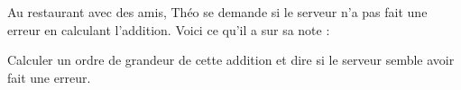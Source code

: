 \begin{colonne*exercice}
\begin{exercice}
   Au restaurant avec des amis, Théo se demande si le serveur n'a pas
fait une erreur en calculant l'addition. Voici ce qu'il a sur sa note :
   \begin{center}
   \end{center}
   Calculer un ordre de grandeur de cette addition et dire si le serveur semble avoir fait une erreur.
\end{exercice}

\end{colonne*exercice}


\Recreation

